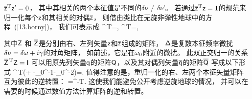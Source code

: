 {{$\overline{\mbox{${\sf z}$}}^{\hspace{0.1 mm}\rm T}\mbox{${\sf z}$}'=0$，
其中其相关的两个本征值是不同的$\delta\nu\neq\delta\nu’$。
若通过$\overline{\mbox{${\sf z}$}}^{\hspace{0.1 mm}\rm T}\mbox{${\sf z}$}=1$的规范来
归一化每个$\mbox{${\sf z}$}$和其相关的对偶$\overline{\mbox{${\sf z}$}}$，
则借由类比在无旋非弹性地球中的方程~(\ref{13.horny})，
我们可表示成
\eq \label{13.foureqns}
\overline{\ssZ}^{\,\rm T}\ssZ=\ssI,
\qquad\overline{\ssZ}^{\,\rm T}\ssH\ssZ=\ssDelta,
\en

其中$\mbox{${\sf Z}$}$ 和 $\overline{\mbox{${\sf Z}$}}$是分别由右、左列矢量$\mbox{${\sf z}$}$和$\overline{\mbox{${\sf z}$}}$组成的矩阵，
$\mbox{${\sf \Delta}$}$是复数本征频率微扰$\delta\nu=\delta\mbox{$\omega$}+i\gamma$的对角矩阵，
如前述，它是在$\mbox{$\omega$}_0$附近的微扰。
此双正交归一的关系
$\overline{\ssZ}^{\hspace{0.5 mm}
\raisebox{-0.4 ex}{\scriptsize\rm T}}
\ssZ=\ssI$
可以用原先列矢量$\mbox{${\sf q}$}$的矩阵$\mbox{${\sf Q}$}$，以及其对偶列矢量$\overline{\mbox{${\sf q}$}}$的矩阵$\overline{\mbox{${\sf Q}$}}$
写成以下形式
\eq \label{13.Qbar}
\overline{\ssQ}^{\,\rm T}(\ssI+\ssT
-\om_0^{-1}\ssW-\invpi\om_0^{-2}\ssA)\ssQ=\ssI.
\en
值得注意的是，重归一化的右、左两个本征矢量矩阵互为彼此的逆转置：
\eq \label{13.JTZZinv}
\overline{\ssZ}=\ssZ^{-\rm T}.
\en
这使我们能避免公开考虑逆旋地球的情况，
并可以在需要的时候通过数值方法计算矩阵的逆和转置。

}}
